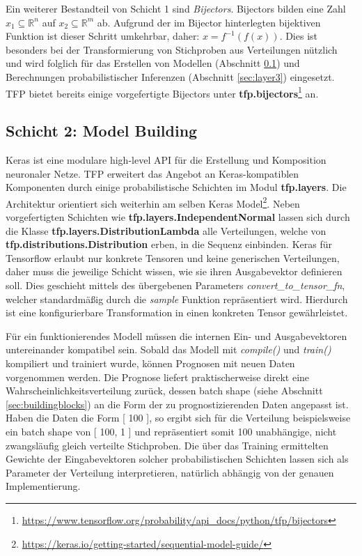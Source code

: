 \documentclass[12pt]{article}
\begin{document}
Ein weiterer Bestandteil von Schicht 1 sind \textit{Bijectors}. Bijectors bilden eine Zahl $x_1 \subseteq \mathbb{R}^n$ auf $x_2 \subseteq \mathbb{R}^m$ ab. Aufgrund der im Bijector hinterlegten bijektiven Funktion ist dieser Schritt umkehrbar, daher: $x = f^{-1}(f(x))$. Dies ist besonders bei der Transformierung von Stichproben aus Verteilungen nützlich und wird folglich für das Erstellen von Modellen (Abschnitt \ref{sec:layer2}) und Berechnungen probabilistischer Inferenzen (Abschnitt \ref{sec:layer3}) eingesetzt. TFP bietet bereits einige vorgefertigte Bijectors unter \textbf{tfp.bijectors}\footnote{\url{https://www.tensorflow.org/probability/api_docs/python/tfp/bijectors}} an. 


\subsection{Schicht 2: Model Building}
\label{sec:layer2}

Keras ist eine modulare high-level API für die Erstellung und Komposition neuronaler Netze. TFP erweitert das Angebot an Keras-kompatiblen Komponenten durch einige probabilistische Schichten im Modul \textbf{tfp.layers}. Die Architektur orientiert sich weiterhin am selben Keras Model\footnote{\url{https://keras.io/getting-started/sequential-model-guide/}}. Neben vorgefertigten Schichten wie \textbf{tfp.layers.IndependentNormal} lassen sich durch die Klasse \textbf{tfp.layers.DistributionLambda} alle Verteilungen, welche von \textbf{tfp.distributions.Distribution} erben, in die Sequenz einbinden. Keras für Tensorflow erlaubt nur konkrete Tensoren und keine generischen Verteilungen, daher muss   die jeweilige Schicht wissen, wie sie ihren Ausgabevektor definieren soll. Dies geschieht mittels des übergebenen Parameters \textit{convert\_to\_tensor\_fn}, welcher standardmäßig durch die \textit{sample} Funktion repräsentiert wird. Hierdurch ist eine konfigurierbare Transformation in einen konkreten Tensor gewährleistet.

Für ein funktionierendes Modell müssen die internen Ein- und Ausgabevektoren untereinander kompatibel sein. Sobald das Modell mit \textit{compile()} und \textit{train()} kompiliert und trainiert wurde, können Prognosen mit neuen Daten vorgenommen werden. Die Prognose liefert praktischerweise direkt eine Wahrscheinlichkeitsverteilung zurück, dessen batch shape (siehe Abschnitt \ref{sec:buildingblocks}) an die Form der zu prognostizierenden Daten angepasst ist. Haben die Daten die Form [ 100 ], so ergibt sich für die Verteilung beispielsweise ein batch shape von [ 100, 1 ] und repräsentiert somit 100 unabhängige, nicht zwangsläufig gleich verteilte Stichproben. Die über das Training ermittelten Gewichte der Eingabevektoren solcher probabilistischen Schichten lassen sich als Parameter der Verteilung interpretieren, natürlich abhängig von der genauen Implementierung.
\end{document}
